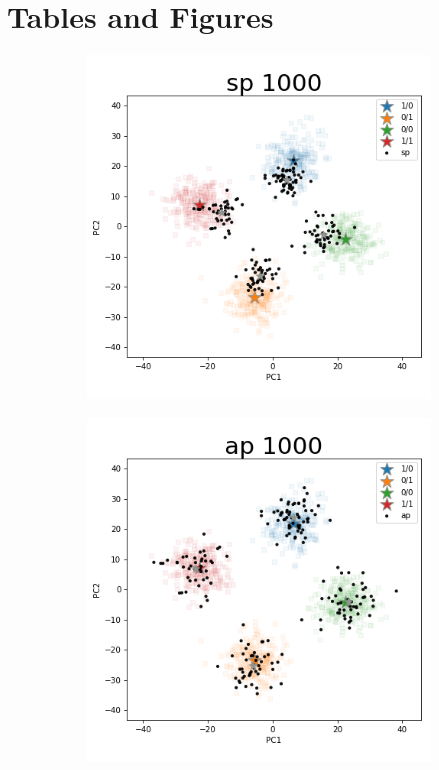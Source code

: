 \documentclass{article}
\begin{document}
\newpage
\section{Tables and Figures}

\begin{figure}[p]
\begin{subfigure}{.5\textwidth}
  \centering
  \includegraphics[width=.98\linewidth]{img/ggsim1000_100000_200_2_1_100_1_sturef_ggsim1000_100000_1000_2_1_100_0_sp}
\end{subfigure}%
\begin{subfigure}{.5\textwidth}
  \centering
  \includegraphics[width=.98\linewidth]{img/ggsim1000_100000_200_2_1_100_1_sturef_ggsim1000_100000_1000_2_1_100_0_ap}

\end{subfigure}
\end{figure}
\end{document}
